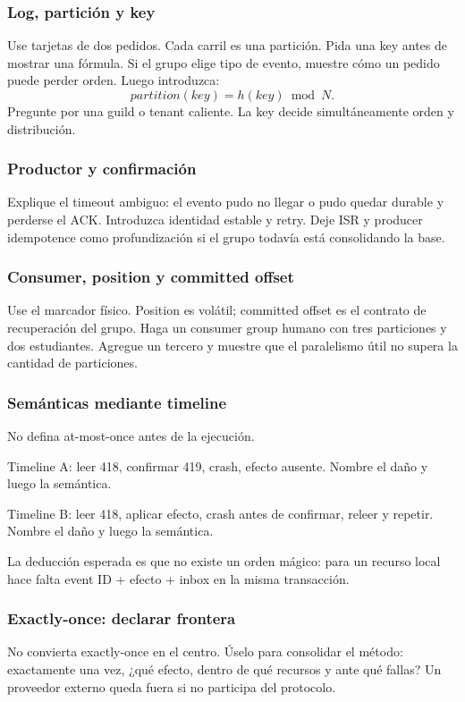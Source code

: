 \documentclass[variant=docente,cover=institutional,mode=screen]{ua-engineering-v6-article}
\begin{document}
\subsubsection{Log, partición y key}
Use tarjetas de dos pedidos. Cada carril es una partición. Pida una key antes de mostrar una fórmula. Si el grupo elige tipo de evento, muestre cómo un pedido puede perder orden. Luego introduzca:
\[
partition(key)=h(key)\bmod N.
\]
Pregunte por una guild o tenant caliente. La key decide simultáneamente orden y distribución.

\subsubsection{Productor y confirmación}
Explique el timeout ambiguo: el evento pudo no llegar o pudo quedar durable y perderse el ACK. Introduzca identidad estable y retry. Deje ISR y producer idempotence como profundización si el grupo todavía está consolidando la base.

\subsubsection{Consumer, position y committed offset}
Use el marcador físico. Position es volátil; committed offset es el contrato de recuperación del grupo. Haga un consumer group humano con tres particiones y dos estudiantes. Agregue un tercero y muestre que el paralelismo útil no supera la cantidad de particiones.

\subsubsection{Semánticas mediante timeline}
No defina at-most-once antes de la ejecución.

Timeline A: leer 418, confirmar 419, crash, efecto ausente. Nombre el daño y luego la semántica.

Timeline B: leer 418, aplicar efecto, crash antes de confirmar, releer y repetir. Nombre el daño y luego la semántica.

La deducción esperada es que no existe un orden mágico: para un recurso local hace falta event ID + efecto + inbox en la misma transacción.

\subsubsection{Exactly-once: declarar frontera}
No convierta exactly-once en el centro. Úselo para consolidar el método: exactamente una vez, ¿qué efecto, dentro de qué recursos y ante qué fallas? Un proveedor externo queda fuera si no participa del protocolo.
\end{document}

